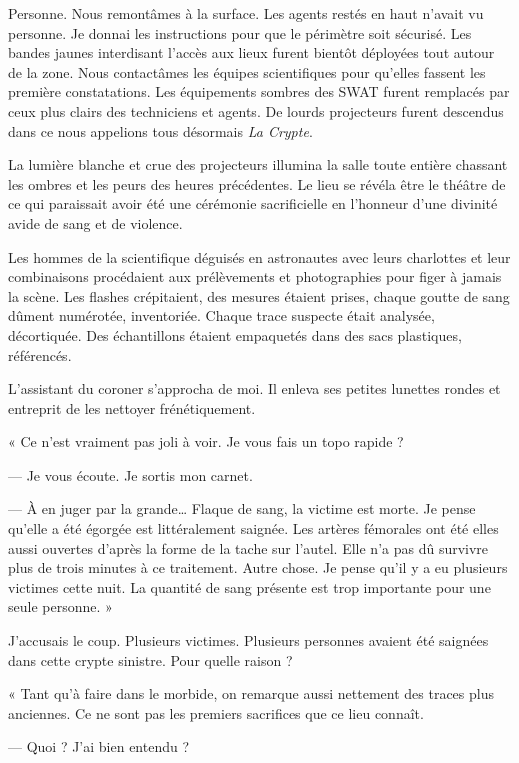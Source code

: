 Personne. Nous remontâmes à la surface. Les agents restés en haut n'avait vu personne. Je donnai les instructions pour 
que le périmètre soit sécurisé. Les bandes jaunes interdisant l'accès aux lieux furent bientôt déployées tout autour 
de la zone. Nous contactâmes les équipes scientifiques pour qu'elles fassent les première constatations. Les 
équipements sombres des SWAT furent remplacés par ceux plus clairs des techniciens et agents. De lourds projecteurs 
furent descendus dans ce nous appelions tous désormais \emph{La Crypte}.

La lumière blanche et crue des projecteurs illumina la salle toute entière chassant les ombres et les peurs des heures 
précédentes. Le lieu se révéla être le théâtre de ce qui paraissait avoir été une cérémonie sacrificielle en l'honneur 
d'une divinité avide de sang et de violence.

Les hommes de la scientifique déguisés en astronautes avec leurs charlottes et leur combinaisons procédaient aux 
prélèvements et photographies pour figer à jamais la scène. Les flashes crépitaient, des mesures étaient prises, chaque 
goutte de sang dûment numérotée, inventoriée. Chaque trace suspecte était analysée, décortiquée. Des échantillons 
étaient empaquetés dans des sacs plastiques, référencés.

L'assistant du coroner s'approcha de moi. Il enleva ses petites lunettes rondes et entreprit de les nettoyer 
frénétiquement.

« Ce n'est vraiment pas joli à voir. Je vous fais un topo rapide ?

— Je vous écoute. Je sortis mon carnet.

— À en juger par la grande… Flaque de sang, la victime est morte. Je pense qu'elle a été égorgée est littéralement 
saignée. Les artères fémorales ont été elles aussi ouvertes d'après la forme de la tache sur l'autel. Elle n'a pas dû 
survivre plus de trois minutes à ce traitement. Autre chose. Je pense qu'il y a eu plusieurs victimes cette nuit. La 
quantité de sang présente est trop importante pour une seule personne. »

J'accusais le coup. Plusieurs victimes. Plusieurs personnes avaient été saignées dans cette crypte sinistre. Pour 
quelle raison ?

« Tant qu'à faire dans le morbide, on remarque aussi nettement des traces plus anciennes. Ce ne sont pas les premiers 
sacrifices que ce lieu connaît.

— Quoi ? J'ai bien entendu ?

